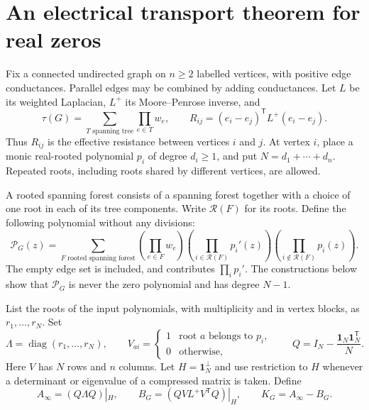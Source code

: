 \section{An electrical transport theorem for real zeros}\label{sec:electrical}

Fix a connected undirected graph on $n\geq2$ labelled vertices, with positive
edge conductances.  Parallel edges may be combined by adding conductances.
Let $L$ be its weighted Laplacian, $L^+$ its Moore--Penrose inverse, and
\[
 \tau(G)=\sum_{T\text{ spanning tree}}\prod_{e\in T}w_e,
 \qquad
 R_{ij}=(e_i-e_j)^{\mathsf T}L^+(e_i-e_j).
\]
Thus $R_{ij}$ is the effective resistance between vertices $i$ and $j$.
At vertex $i$, place a monic real-rooted polynomial $p_i$ of degree
$d_i\geq1$, and put $N=d_1+\cdots+d_n$.
Repeated roots, including roots shared by different vertices, are allowed.

A rooted spanning forest consists of a spanning forest together with a
choice of one root in each of its tree components.  Write $\mathcal R(F)$
for its roots.  Define the following polynomial without any divisions:
\begin{equation}\label{eq:forest-polynomial}
 \mathcal P_G(z)=
 \sum_{F\text{ rooted spanning forest}}
 \left(\prod_{e\in F}w_e\right)
 \left(\prod_{i\in\mathcal R(F)}p_i'(z)\right)
 \left(\prod_{i\notin\mathcal R(F)}p_i(z)\right).
\end{equation}
The empty edge set is included, and contributes $\prod_i p_i'$.
The constructions below show that $\mathcal P_G$ is never the zero
polynomial and has degree $N-1$.

List the roots of the input polynomials, with multiplicity and in vertex
blocks, as $r_1,\ldots,r_N$.  Set
\[
 \Lambda=\operatorname{diag}(r_1,\ldots,r_N),\qquad
 V_{ai}=\begin{cases}1&\text{root }a\text{ belongs to }p_i,\\0&\text{otherwise},\end{cases}
 \qquad Q=I_N-\frac{\boldsymbol 1_N\boldsymbol 1_N^{\mathsf T}}{N}.
\]
Here $V$ has $N$ rows and $n$ columns.  Let
$H=\boldsymbol 1_N^\perp$ and use restriction to $H$ whenever a determinant
or eigenvalue of a compressed matrix is taken.  Define
\[
 A_\infty=(Q\Lambda Q)|_H,\qquad
 B_G=(QV L^+V^{\mathsf T}Q)|_H,\qquad K_G=A_\infty-B_G.
\]

